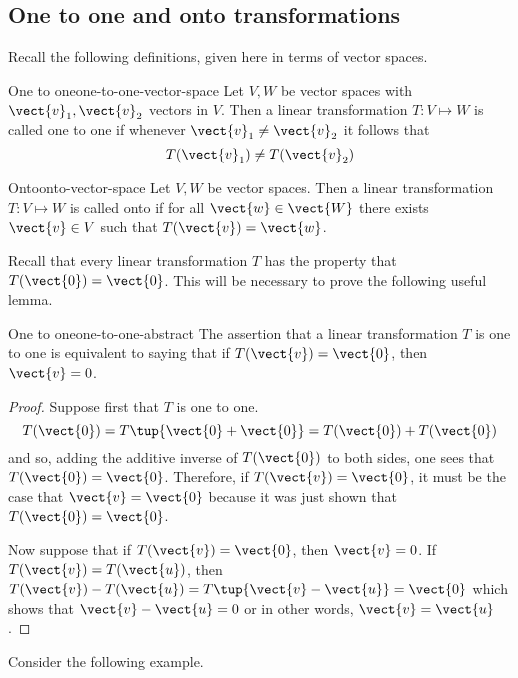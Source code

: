 \subsection{One to one and onto transformations}

Recall the following definitions, given here in terms of vector spaces.

\begin{definition}{One to one}{one-to-one-vector-space}
Let $V, W$ be vector spaces with $\vect{v}_1, \vect{v}_2$ vectors in $V$. Then a linear transformation $T: V \mapsto W$ is called one to one if whenever $\vect{v}_1 \neq \vect{v}_2$ it follows that 
\[
T(\vect{v}_1) \neq T (\vect{v}_2)
\]
\end{definition}

\begin{definition}{Onto}{onto-vector-space}
Let $V, W$ be vector spaces. Then a linear transformation $T: V \mapsto W$ is called onto if for all $\vect{w} \in \vect{W}$ there exists $\vect{v} \in V$ such that $T(\vect{v}) = \vect{w}$. 
\end{definition}

Recall that every linear transformation $T$ has the property that $T(\vect{0})=\vect{0}$. This will be necessary to prove the following useful lemma. 

\begin{lemma}{One to one}{one-to-one-abstract}
The assertion that a linear transformation $T$ is one to one is equivalent to
saying that if $T(\vect{v})=\vect{0}$, then $\vect{v}=0$. 
\end{lemma}

\begin{proof}
Suppose first that $T$ is one to one. 
\begin{equation*}
T(\vect{0})=T\tup{\vect{0}+\vect{0}} =T(\vect{0})+T(\vect{0})
\end{equation*}
and so, adding the additive inverse of $T(\vect{0})$ to both sides, one sees
that $T(\vect{0})=\vect{0}$. Therefore, if $T(\vect{v})=\vect{0}$, it must be the
case that $\vect{v}=\vect{0}$ because it was just shown that $T(\vect{0})=\vect{0}$.

Now suppose that if $T(\vect{v})=\vect{0}$, then $\vect{v}=0$. If $T(\vect{v})=T(\vect{u})$, then $T(\vect{v})-T(\vect{u})=T\tup{\vect{v}-\vect{u}} =\vect{0}$ which
shows that $\vect{v}-\vect{u}=0$ or in other words, $\vect{v}=\vect{u}$. 
\end{proof}

Consider the following example.

